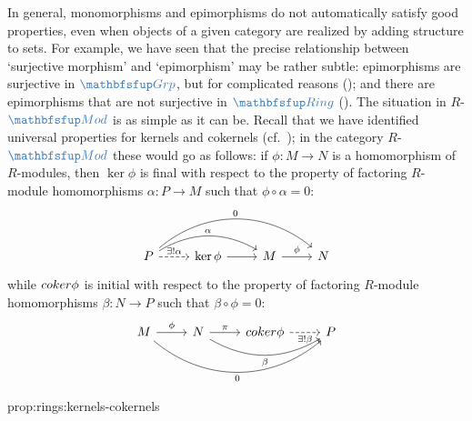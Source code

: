 In general, monomorphisms and epimorphisms do not automatically
satisfy good properties, even when objects of a given category are
realized by adding structure to sets. For example, we have seen that
the precise relationship between `surjective morphism' and
`epimorphism' may be rather subtle: epimorphisms are surjective in
$\categ{Grp}$, but for complicated reasons
(); and there are
epimorphisms that are not surjective in $\categ{Ring}$
().  The
situation in $R$-$\categ{Mod}$ is as simple as it can be. Recall that
we have identified universal properties for kernels and cokernels
(cf.\ ); in the
category $R$-$\categ{Mod}$ these would go as follows: if
$\phi : M \to N$ is a homomorphism of $R$-modules, then $\ker\phi$ is
final with respect to the property of factoring $R$-module
homomorphisms $\alpha : P \to M$ such that $\phi \circ \alpha = 0$:
\[\begin{tikzcd}
    P \arrow[r, dashed, "\exists!\alpha"] \arrow[rr, bend left,
    "\alpha"] \arrow[rrr, bend left=40, "0"] & \ker\phi \arrow[r] & M
    \arrow[r, "\phi"] & N
  \end{tikzcd}\] while $coker\phi$ is initial with respect to the
property of factoring $R$-module homomorphisms $\beta : N \to P$ such
that $\beta \circ \phi = 0$:
\[\begin{tikzcd}
    M \arrow[r, "\phi"] \arrow[rrr, bend right=40, "0"'] & N \arrow[r,
    "\pi"] \arrow[rr, bend right, "\beta"'] & \coker\phi \arrow[r,
    dashed, "\exists!\beta"'] & P
  \end{tikzcd}\]
\begin{prop}{}{prop:rings:kernels-cokernels}
\end{prop}
